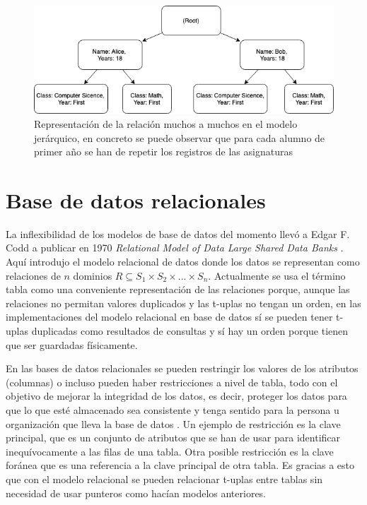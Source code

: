 \documentclass[12pt]{article}
\begin{document}
    \begin{figure}[h]
      \includegraphics[width=\textwidth]{HierarchicalModelManyToMany.png}
      \centering
      \caption[Representación de una relación muchos a muchos en el modelo jerárquico]{Representación de la relación muchos a muchos en el modelo jerárquico, en concreto se puede observar que para cada alumno de primer año se han de repetir los registros de las asignaturas}
      \label{fig:HierarchicalModelManyToMany}
    \end{figure}

  \section{Base de datos relacionales}
    La inflexibilidad de los modelos de base de datos del momento llevó a Edgar F. Codd a publicar en 1970 \textit{Relational Model of Data Large Shared Data Banks} \cite{Codd_RelationalModelofDataLargeSharedDataBanks}. Aquí introdujo el modelo relacional de datos donde los datos se representan como relaciones de $n$ dominios $R \subseteq S_1 \times S_2 \times...\times S_n$. Actualmente se usa el término tabla como una conveniente representación de las relaciones porque, aunque las relaciones no permitan valores duplicados y las t-uplas no tengan un orden, en las implementaciones del modelo relacional en base de datos sí se pueden tener t-uplas duplicadas como resultados de consultas y sí hay un orden porque tienen que ser guardadas físicamente.


    En las bases de datos relacionales se pueden restringir los valores de los atributos (columnas) o incluso pueden haber restricciones a nivel de tabla, todo con el objetivo de mejorar la integridad de los datos, es decir, proteger los datos para que lo que esté almacenado sea consistente y tenga sentido para la persona u organización que lleva la base de datos \cite{Stackoverflow_WhatAreDatabaseConstraints}. Un ejemplo de restricción es la clave principal, que es un conjunto de atributos que se han de usar para identificar inequívocamente a las filas de una tabla. Otra posible restricción es la clave foránea que es una referencia a la clave principal de otra tabla. Es gracias a esto que con el modelo relacional se pueden relacionar t-uplas entre tablas sin necesidad de usar punteros como hacían modelos anteriores. 
    
\end{document}
